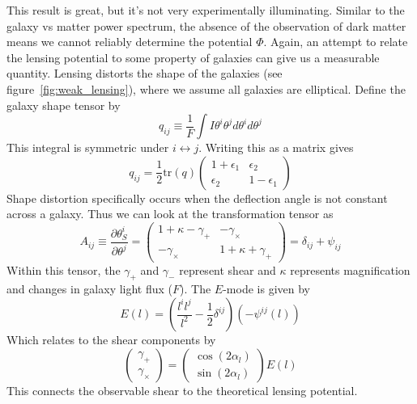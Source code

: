 This result is great, but it's not very experimentally illuminating. Similar to the galaxy vs matter power spectrum, the absence of the observation of dark matter means we cannot reliably determine the potential $\Phi$. Again, an attempt to relate the lensing potential to some property of galaxies can give us a measurable quantity. Lensing distorts the shape of the galaxies (see figure~\ref{fig:weak_lensing}), where we assume all galaxies are elliptical. Define the galaxy shape tensor by
\begin{equation}
	q_{ij} \equiv \frac{1}{F}\int I\theta^i\theta^j d\theta^i d\theta^j
\end{equation}
This integral is symmetric under $i \leftrightarrow j$. Writing this as a matrix gives
\begin{equation}
	q_{ij} = \frac{1}{2} \text{tr}(q) \left( 
	\begin{array}{cc}
	1+\epsilon_1 & \epsilon_2 \\
	\epsilon_2 & 1-\epsilon_1
	\end{array}
	\right)
\end{equation}
Shape distortion specifically occurs when the deflection angle is not constant across a galaxy. Thus we can look at the transformation tensor as
\begin{equation}
	A_{ij} \equiv \frac{\partial \theta^i_S}{\partial\theta^j} = \left( 
	\begin{array}{cc}
	1+\kappa - \gamma_+ & -\gamma_\times \\
	-\gamma_\times & 1+\kappa+\gamma_+
	\end{array}
	\right) = \delta_{ij}+\psi_{ij}
\end{equation}
Within this tensor, the $\gamma_+$ and $\gamma_-$ represent shear and $\kappa$ represents magnification and changes in galaxy light flux ($F$). The $E$-mode is given by
\begin{equation}
	E(l) = \left( \frac{l^il^j}{l^2} - \frac{1}{2}\delta^{ij} \right)(-\psi^{ij}(l))
\end{equation}
Which relates to the shear components by
\begin{equation}
	\left(
	\begin{array}{c}
	\gamma_+ \\
	\gamma_\times
	\end{array}
	\right)
	=
	\left(
	\begin{array}{c}
	\cos(2\alpha_l) \\
	\sin(2\alpha_l)
	\end{array}
	\right)
	E(l)
\end{equation}
This connects the observable shear to the theoretical lensing potential.
